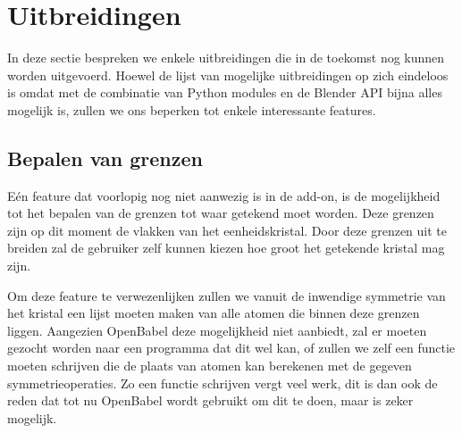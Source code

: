 \section{Uitbreidingen}
In deze sectie bespreken we enkele uitbreidingen die in de toekomst nog kunnen worden uitgevoerd. Hoewel de lijst van mogelijke uitbreidingen op zich eindeloos is omdat met de combinatie van Python modules en de Blender API bijna alles mogelijk is, zullen we ons beperken tot enkele interessante features.

\subsection{Bepalen van grenzen}
Eén feature dat voorlopig nog niet aanwezig is in de add-on, is de mogelijkheid tot het bepalen van de grenzen tot waar getekend moet worden. Deze grenzen zijn op dit moment de vlakken van het eenheidskristal. Door deze grenzen uit te breiden zal de gebruiker zelf kunnen kiezen hoe groot het getekende kristal mag zijn. 
\par
Om deze feature te verwezenlijken zullen we vanuit de inwendige symmetrie van het kristal een lijst moeten maken van alle atomen die binnen deze grenzen liggen. Aangezien OpenBabel deze mogelijkheid niet aanbiedt, zal er moeten gezocht worden naar een programma dat dit wel kan, of zullen we zelf een functie moeten schrijven die de plaats van atomen kan berekenen met de gegeven symmetrieoperaties. Zo een functie schrijven vergt veel werk, dit is dan ook de reden dat tot nu OpenBabel wordt gebruikt om dit te doen, maar is zeker mogelijk.
\par

